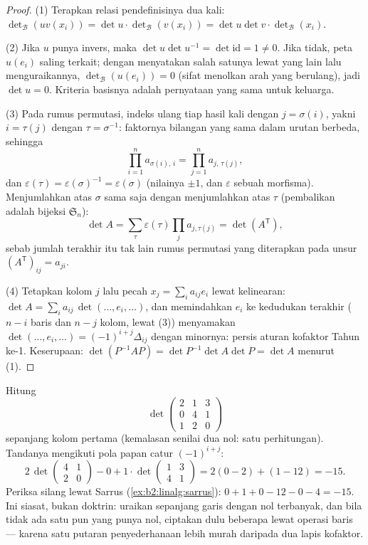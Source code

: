 \begin{proof}
(1) Terapkan relasi pendefinisinya dua kali:
$\det_{\mathcal B}(uv(x_i)) = \det u \cdot \det_{\mathcal
B}(v(x_i)) = \det u \det v \cdot \det_{\mathcal B}(x_i)$.

(2) Jika $u$ punya invers, maka $\det u \det u^{-1} = \det \mathrm{id} =
1 \neq 0$. Jika tidak, peta $u(e_i)$ saling terkait; dengan menyatakan
salah satunya lewat yang lain lalu menguraikannya, $\det_{\mathcal B}(u(e_i)) = 0$
(sifat  menolkan arah yang berulang), jadi $\det u = 0$. Kriteria
basisnya adalah pernyataan yang sama untuk keluarga.

(3) Pada rumus permutasi, indeks ulang tiap hasil kali dengan $j =
\sigma(i)$, yakni $i = \tau(j)$ dengan $\tau = \sigma^{-1}$: faktornya
bilangan yang sama dalam urutan berbeda, sehingga
\[
\prod_{i=1}^{n} a_{\sigma(i),\,i} = \prod_{j=1}^{n}
a_{j,\,\tau(j)} ,
\]
dan $\varepsilon(\tau) = \varepsilon(\sigma)^{-1} =
\varepsilon(\sigma)$ (nilainya $\pm1$, dan $\varepsilon$ sebuah
morfisma). Menjumlahkan atas $\sigma$ sama saja dengan menjumlahkan atas
$\tau$ (pembalikan adalah bijeksi $\mathfrak{S}_n$):
\[
\det A = \sum_{\tau}\varepsilon(\tau)\prod_j a_{j,\tau(j)}
= \det(A^{\mathsf T}),
\]
sebab jumlah terakhir itu tak lain rumus permutasi yang diterapkan pada
unsur  $(A^{\mathsf T})_{ij} = a_{ji}$.

(4) Tetapkan kolom $j$ lalu pecah $x_j = \sum_i a_{ij} e_i$ lewat
kelinearan: $\det A = \sum_i a_{ij}\, \det(\dots, e_i, \dots)$, dan
memindahkan $e_i$ ke kedudukan terakhir ($n - i$  baris dan
$n - j$  kolom, lewat (3)) menyamakan $\det(\dots, e_i, \dots) =
(-1)^{i+j}\Delta_{ij}$ dengan minornya: persis aturan kofaktor Tahun
ke-1. Keserupaan: $\det(P^{-1}AP) = \det P^{-1}\det A \det P =
\det A$ menurut (1).
\end{proof}

\begin{example}\label{ex:b2:linalg:cofactorwork}
Hitung
\[
\det\begin{pmatrix}
2 & 1 & 3\\
0 & 4 & 1\\
1 & 2 & 0
\end{pmatrix}
\]
sepanjang kolom pertama (kemalasan senilai dua nol: satu perhitungan).
Tandanya mengikuti pola papan catur $(-1)^{i+j}$:
\[
2\,\det\begin{pmatrix}4 & 1\\ 2 & 0\end{pmatrix}
- 0
+ 1\cdot\det\begin{pmatrix}1 & 3\\ 4 & 1\end{pmatrix}
= 2(0 - 2) + (1 - 12) = -15 .
\]
Periksa silang lewat Sarrus (\cref{ex:b2:linalg:sarrus}): $0 + 1 + 0
- 12 - 0 - 4 = -15$. Ini siasat, bukan doktrin: uraikan sepanjang
garis dengan nol terbanyak, dan bila tidak ada satu pun yang punya
nol, ciptakan dulu beberapa lewat operasi baris --- karena satu putaran
penyederhanaan lebih murah daripada dua lapis kofaktor.
\end{example}

